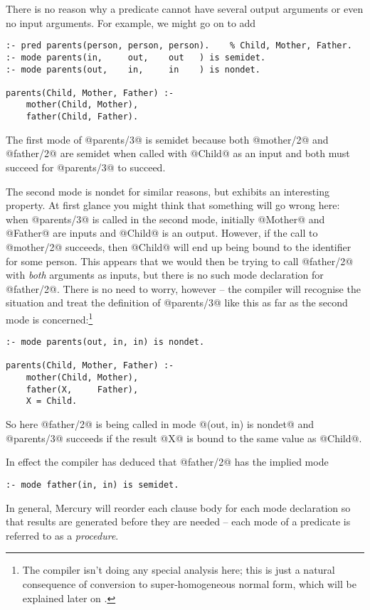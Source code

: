 There is no reason why a predicate cannot have several output
arguments or even no input arguments.  For example, we
might go on to add
\begin{verbatim}
:- pred parents(person, person, person).    % Child, Mother, Father.
:- mode parents(in,     out,    out   ) is semidet.
:- mode parents(out,    in,     in    ) is nondet.

parents(Child, Mother, Father) :-
    mother(Child, Mother),
    father(Child, Father).
\end{verbatim}
The first mode of @parents/3@ is semidet because both @mother/2@
and @father/2@ are semidet when called with @Child@ as an input
and both must succeed for @parents/3@ to succeed.

The second mode is nondet for similar reasons, but exhibits an
interesting property.  At first glance you might think that
something will go wrong here: when @parents/3@ is called in the
second mode, initially @Mother@ and @Father@ are inputs and @Child@
is an output.  However, if the call to @mother/2@ succeeds, then
@Child@ will end up being bound to the identifier for some
person.  This appears that we would then be trying to call
@father/2@ with \emph{both} arguments as inputs, but there is no such
mode declaration for @father/2@.  There is no need to worry,
however -- the compiler will recognise the situation and treat
the definition of @parents/3@ like this as far as the second
mode is concerned:\footnote{The compiler isn't doing any special analysis here;
this is just a natural consequence of conversion to
super-homogeneous normal form, which will be explained later
on \XXX{}.}
\begin{verbatim}
:- mode parents(out, in, in) is nondet.

parents(Child, Mother, Father) :-
    mother(Child, Mother),
    father(X,     Father),
    X = Child.
\end{verbatim}
So here @father/2@ is being called in mode @(out, in) is nondet@ and
@parents/3@ succeeds if the result @X@ is bound to the same value
as @Child@.

In effect the compiler has deduced that @father/2@ has the
implied mode
\begin{verbatim}
:- mode father(in, in) is semidet.
\end{verbatim}
In general, Mercury will reorder each clause body for each mode
declaration so that results are generated before they are needed -- each
mode of a predicate is referred to as a \emph{procedure}.

